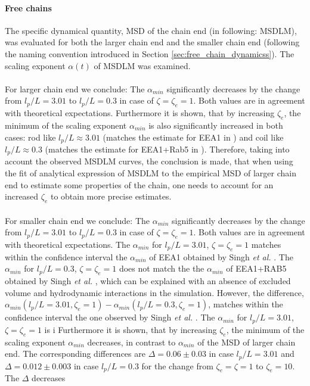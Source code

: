\documentclass[
    paper=A4,pagesize=automedia,fontsize=12pt,
    BCOR=15mm,DIV=22,
    twoside,headinclude,footinclude=false,
    fleqn,             %
    bibliography=totocnumbered,          %
    listof=totoc,                %
    listof=flat,                 %
    cleardoublepage=empty      %
    numbers=endperiod
]{scrartcl}
\begin{document}
\paragraph{Free chains}
The specific dynamical quantity, MSD of the chain end (in following: MSDLM), was evaluated for both 
the larger chain end and the smaller chain end (following the naming convention introduced 
in Section \ref{sec:free_chain_dynamicss}). 
The scaling exponent $\alpha(t)$ of MSDLM was examined.
\\
\\
For larger chain end we conclude: The $\alpha_{min}$ 
significantly decreases by the change from $l_p/L=3.01$ to $l_p/L=0.3$ 
in case of $\zeta=\zeta_e=1$. Both values are in agreement 
with theoretical expectations.
Furthermore it is shown, that
by increasing $\zeta_e$, the minimum of the scaling exponent $\alpha_{min}$ is also 
significantly increased in both cases: rod like $l_p/L \approx 3.01$ (matches the 
estimate for EEA1 in \cite{Singh:2022}) and
coil like  $l_p/L \approx 0.3$ (matches the estimate for EEA1+Rab5 in \cite{Singh:2022}).
Therefore, taking into account the observed MSDLM curves, the conclusion is made,
that when using the fit of analytical expression of MSDLM to the empirical MSD of
larger chain end to estimate some properties of the chain, one needs to account
for an increased $\zeta_e$ to obtain more precise estimates.
\\
\\
For smaller chain end we conclude: The $\alpha_{min}$ significantly
decreases by the change from $l_p/L=3.01$ to $l_p/L=0.3$ 
in case of $\zeta=\zeta_e=1$. Both values are in agreement with theoretical expectations.
The $\alpha_{min}$ for $l_p/L=3.01$, $\zeta=\zeta_e=1$ matches within the confidence interval
the $\alpha_{min}$ of EEA1 obtained by Singh \emph{et al.} \cite{Singh:2022}.
The $\alpha_{min}$ for $l_p/L=0.3$, $\zeta=\zeta_e=1$ does not match the 
the $\alpha_{min}$ of EEA1+RAB5 obtained by Singh \emph{et al.} \cite{Singh:2022}, which
can be explained with an absence of excluded volume and hydrodynamic interactions in the
simulation. However, the difference,
$\alpha_{min}(l_p/L=3.01, \zeta_e=1) - \alpha_{min}(l_p/L=0.3, \zeta_e=1)$, matches
within the confidence interval the one observed by Singh \emph{et al.} \cite{Singh:2022}.
The $\alpha_{min}$ for $l_p/L=3.01$, $\zeta=\zeta_e=1$ is i
Furthermore it is shown, that by increasing $\zeta_e$, 
the minimum of the scaling exponent $\alpha_{min}$ decreases, in contrast to
$\alpha_{min}$ of the MSD of larger chain end. The corresponding differences are
$\Delta=0.06\pm0.03$ in case $l_p/L=3.01$ and  
$\Delta=0.012\pm0.003$ in case $l_p/L=0.3$ for the change from $\zeta_e=\zeta=1$ 
to $\zeta_e=10$. The $\Delta$ decreases  
\end{document}
